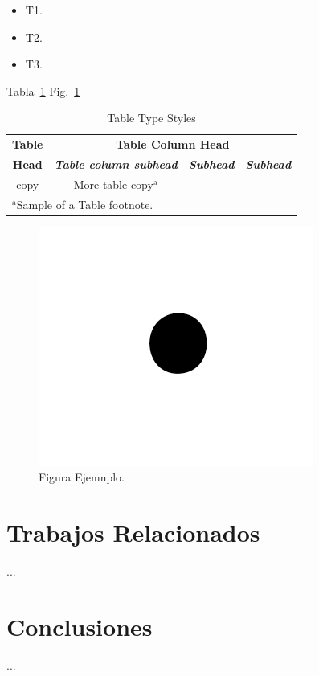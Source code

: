 \documentclass[conference]{IEEEtran}
\begin{document}
\begin{itemize}
    \item T1.
    \item T2.
    \item T3.
\end{itemize}

Tabla~\ref{tab:1}
Fig.~\ref{fig:1}

\begin{table}[htbp]
    \caption{Table Type Styles}
    \begin{center}
        \begin{tabular}{|c|c|c|c|}
            \hline
            \textbf{Table} & \multicolumn{3}{|c|}{\textbf{Table Column Head}}                                                         \\
            \cline{2-4}
            \textbf{Head}  & \textbf{\textit{Table column subhead}}           & \textbf{\textit{Subhead}} & \textbf{\textit{Subhead}} \\
            \hline
            copy           & More table copy$^{\mathrm{a}}$                   &                           &                           \\
            \hline
            \multicolumn{4}{l}{$^{\mathrm{a}}$Sample of a Table footnote.}
        \end{tabular}
        \label{tab:1}
    \end{center}
\end{table}

\begin{figure}[htbp]
    \centerline{\includegraphics{Figures/fig1.png}}
    \caption{Figura Ejemnplo.}
    \label{fig:1}
\end{figure}


\section{Trabajos Relacionados}
\label{sec:TR}
...


\section{Conclusiones}
\label{sec:Conclusiones}
...



\end{document}
